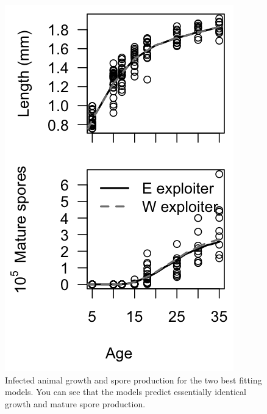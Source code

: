 \documentclass[12pt,reqno,final,pdftex]{amsart}\usepackage[]{graphicx}\usepackage[]{color}
\newenvironment{knitrout}{}{} %
\theoremstyle{plain}
\numberwithin{equation}{part}
\begin{document}
\begin{knitrout}\scriptsize
{}\color{fgcolor}\begin{figure}

\includegraphics[width=\linewidth]{figure/best-fit-1} \hfill{}

\caption[Infected animal growth and spore production for the two best fitting models]{Infected animal growth and spore production for the two best fitting models. You can see that the models predict essentially identical growth and mature spore production.}\label{fig:best-fit}
\end{figure}


\end{knitrout}
\end{document}
